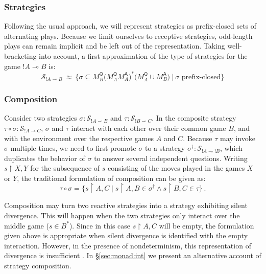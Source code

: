 \documentclass[acmsmall,timestamp,review,anonymous]{acmart}
\newcommand{\kw}[1]{\ensuremath{ \mathsf{#1} }}
\begin{document}

\subsubsection{Strategies} %

Following the usual approach,
we will represent strategies as prefix-closed sets of alternating plays.
Because we limit ourselves to receptive strategies,
odd-length plays can remain implicit and be left out of the representation.
Taking well-bracketing into account,
a first approximation of the type of strategies
for the game $!A \multimap B$ is:
\[
  \mathcal{S}_{!A \multimap B} \: \approx \:
   \big\{ \sigma \subseteq
      M^\kw{Q}_B
      \big( M^\kw{Q}_A M^\kw{A}_A \big)^*
      \big( M^\kw{Q}_A \cup M^\kw{A}_B \big) \: \big| \:
      \sigma \mbox{ prefix-closed} \big\}
\]


\subsubsection{Composition} \label{sec:sem:games:comp} %

Consider two strategies
$\sigma : \mathcal{S}_{!A \multimap B}$ and
$\tau : \mathcal{S}_{!B \multimap C}$.
In the composite strategy
$\tau \circ \sigma : \mathcal{S}_{!A \multimap C}$,
$\sigma$ and $\tau$ interact
with each other over their common game $B$,
and with the environment over the respective games $A$ and $C$.
Because $\tau$ may invoke $\sigma$ multiple times,
we need to first promote $\sigma$ to a strategy
$\sigma^\dagger : \mathcal{S}_{{!A} \multimap {!B}}$,
which duplicates the behavior of $\sigma$ to answer several independent questions.
Writing $s \restriction X,Y$ for
the subsequence of $s$ consisting of the moves played in the games $X$ or $Y$,
the traditional formulation of composition
can be given as:
\[
    \tau \circ \sigma =
    \{ s \restriction {A,C} \mid
       s \restriction {A,B} \in \sigma^\dagger \wedge
       s \restriction {B,C} \in \tau \} \,.
\]

Composition may turn two reactive strategies
into a strategy exhibiting silent divergence.
This will happen when
the two strategies only interact over the middle game ($s \in B^*$).
Since in this case $s \restriction A,C$ will be empty,
the formulation given above is appropriate when
silent divergence is identified with the empty interaction.
However,
in the presence of nondeterminism,
this representation of divergence is insufficient \cite{gsnondet}.
In \S\ref{sec:monad:int}
we present an alternative
account of strategy composition.
\end{document}
